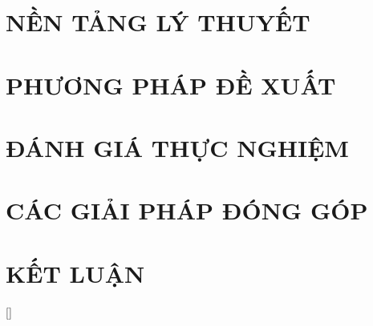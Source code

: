 \documentclass[a4paper,13pt,3p,twoside]{report}
\renewcommand{\bibname}{Danh_sach_tai_lieu_tham_khao}
\theoremstyle{definition}
\begin{document}
\newpage
\chapter{NỀN TẢNG LÝ THUYẾT}
\label{chapter:Theory}


\newpage
\chapter{PHƯƠNG PHÁP ĐỀ XUẤT}
\label{chapter:Methodology}


\newpage
\chapter{ĐÁNH GIÁ THỰC NGHIỆM}
\label{chapter:Experiment}


\newpage
\chapter{CÁC GIẢI PHÁP ĐÓNG GÓP}
\label{chapter:Contributions}


\newpage
\chapter{KẾT LUẬN}
\label{chapter:conclusion}


% 

\newpage
\renewcommand\bibname{TÀI LIỆU THAM KHẢO}
\printbibliography
{}

\appendixpage
\appendices
\addappheadtotoc

[]
\titlespacing*{\chapter}{0pt}{-20pt}{20pt}
\end{document}
